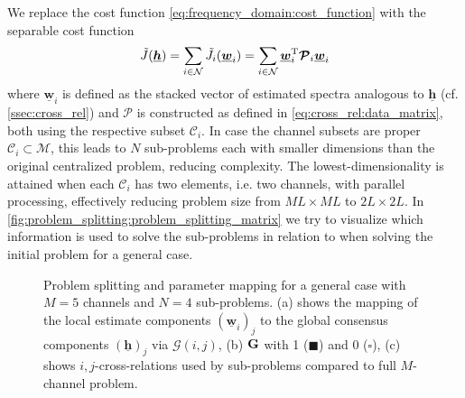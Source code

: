 \documentclass{article}
\newcommand{\hf}{\underline{\bm{h}}}
\newcommand{\wf}{\underline{\bm{w}}}
\newcommand{\aRhof}{\bm{\mathcal{P}}}
\newcommand{\Cset}{\mathcal{C}}
\newcommand{\Mset}{\mathcal{M}}
\newcommand{\Nset}{\mathcal{N}}
\begin{document}
We replace the cost function \eqref{eq:frequency_domain:cost_function} with the separable cost function 
\begin{equation}
    \tilde{J}(\hf) = \sum_{i \in \Nset} \tilde{J}_i(\wf_i)  = \sum_{i \in \Nset} \wf_i^\T \aRhof_i \wf_i
    \label{eq:problem_splitting:cost_function}
\end{equation}
where \(\wf_i\) is defined as the stacked vector of estimated spectra analogous to \(\hf\) (cf. \autoref{ssec:cross_rel}) and \(\aRhof\) is constructed as defined in \eqref{eq:cross_rel:data_matrix}, both using the respective subset \(\Cset_i\).
In case the channel subsets are proper \(\Cset_i \subset \Mset\), this leads to \(N\) sub-problems each with smaller dimensions than the original centralized problem, reducing complexity.
The lowest-dimensionality is attained when each \(\Cset_i\) has two elements, i.e. two channels, with parallel processing, effectively reducing problem size from \(ML \times ML\) to \(2L \times 2L\).
In \autoref{fig:problem_splitting:problem_splitting_matrix} we try to visualize which information is used to solve the sub-problems in relation to when solving the initial problem for a general case.

\begin{figure}
    \centering
    \subfloat[][]{}
    \subfloat[][]{}
    \vspace*{-0.3cm}
    \caption{Problem splitting and parameter mapping for a general case with \(M=5\) channels and \(N=4\) sub-problems. (a) shows the mapping of the local estimate components \((\wf_i)_j\) to the global consensus components \((\hf)_j\) via \(\mathcal{G}(i,j)\), (b) \(\bm{\mathrm{G}}\) with 1 (\(\blacksquare\)) and 0 (\(\square\)), (c) shows \(i,j\)-cross-relations used by sub-problems compared to full \(M\)-channel problem.}
    \label{fig:problem_splitting:problem_splitting_matrix}
\end{figure}
\end{document}
